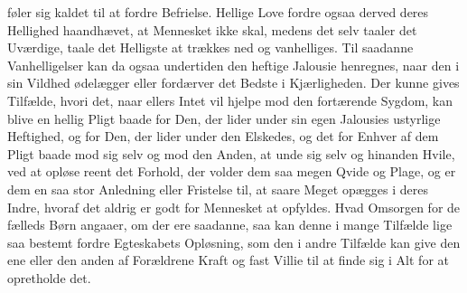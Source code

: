 \documentclass[12pt,a4paper]{book}
\newcommand{\apage}[1]{\marginnote{\footnotesize\textit{[#1]}}}
\begin{document}
føler sig kaldet til at fordre Befrielse. Hellige Love fordre ogsaa
derved deres Hellighed haandhævet, at Mennesket ikke skal, medens det
selv taaler det Uværdige, taale det Helligste at trækkes ned og
vanhelliges. Til saadanne Vanhelligelser kan da ogsaa undertiden den
heftige Jalousie henregnes, naar den i sin Vildhed ødelægger eller
fordærver det Bedste i Kjærligheden. Der kunne gives Tilfælde, hvori det,
naar ellers Intet vil hjelpe mod den fortærende Sygdom, kan blive en
hellig Pligt baade for Den, der lider under sin egen Jalousies ustyrlige
Heftighed, og for Den, der lider under den Elskedes, og det for Enhver af
dem Pligt baade mod sig selv og mod den Anden, at unde sig selv og
hinanden Hvile, ved at opløse reent det Forhold, der volder dem saa megen
Qvide og Plage, og er dem en saa stor Anledning eller \apage{144} Fristelse til, at
saare Meget opægges i deres Indre, hvoraf det aldrig er godt for
Mennesket at opfyldes. Hvad Omsorgen for de fælleds Børn angaaer, om der
ere saadanne, saa kan denne i mange Tilfælde lige saa bestemt fordre
Egteskabets Opløsning, som den i andre Tilfælde kan give den ene eller
den anden af Forældrene Kraft og fast Villie til at finde sig i Alt for
at opretholde det.
\end{document}
